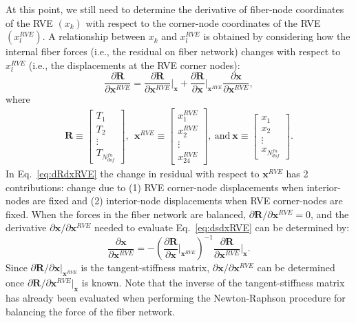 At this point, we still need to determine the derivative of fiber-node coordinates of the RVE $(x_k)$ with respect to the corner-node coordinates of the RVE $(x_l^{RVE})$. A relationship between $x_k$ and $x_l^{RVE}$ is obtained by considering how the internal fiber forces (i.e., the residual on fiber network) changes with respect to $x_l^{RVE}$ (i.e., the displacements at the RVE corner nodes):
%
\begin{equation}
\frac{\partial \pmb{R}}{\partial \pmb{x}^{RVE}} = \frac{\partial \pmb{R}}{\partial \pmb{x}^{RVE}} \bigg |_{\pmb{x}} + \frac{\partial \pmb{R}}{\partial \pmb{x}} \bigg |_{\pmb{x}^{RVE}} \frac{\partial \pmb{x}}{\partial \pmb{x}^{RVE}},
\label{eq:dRdxRVE}
\end{equation}
%
where
%
\begin{eqnarray}
\pmb{R} \equiv \begin{bmatrix}
T_1 \\
T_2 \\
\vdots \\
T_{N_{dof}^{fn}}
\end{bmatrix}, \ \ 
%
\pmb{x}^{RVE} \equiv \begin{bmatrix}
x_1^{RVE} \\
x_2^{RVE} \\
\vdots \\
x_{24}^{RVE}
\end{bmatrix}, \ \text{and} \
%
\pmb{x} \equiv \begin{bmatrix}
x_1 \\
x_2 \\
\vdots \\
x_{N_{dof}^{fn}} 
\end{bmatrix} .
\end{eqnarray}
%
In Eq.\ \eqref{eq:dRdxRVE} the change in residual with respect to $\pmb{x}^{RVE}$ has 2 contributions: change due to (1) RVE corner-node displacements when interior-nodes are fixed and (2) interior-node displacements when RVE corner-nodes  are fixed. When the forces in the fiber network are balanced, $\partial \pmb{R}/\partial \pmb{x}^{RVE} = 0$, and the derivative $\partial \pmb{x}/\partial \pmb{x}^{RVE}$ needed to evaluate Eq.\ \eqref{eq:dsdxRVE} can be determined by:
%
\begin{equation}
\frac{\partial \pmb{x}}{\partial \pmb{x}^{RVE}} = -\left(\frac{\partial \pmb{R}}{\partial \pmb{x}} \bigg |_{\pmb{x}^{RVE}}\right)^{-1}\frac{\partial \pmb{R}}{\partial \pmb{x}^{RVE}}\bigg |_{\pmb{x}} .
\end{equation}
%
Since $\partial \pmb{R}/\partial \pmb{x} |_{\pmb{x}^{RVE}}$ is the tangent-stiffness matrix, $\partial \pmb{x}/\partial \pmb{x}^{RVE}$ can be determined once $\partial \pmb{R}/\partial \pmb{x}^{RVE} |_{\pmb{x}}$ is known. Note that the inverse of the tangent-stiffness matrix has already been evaluated when performing the Newton-Raphson procedure for balancing the force of the fiber network.

